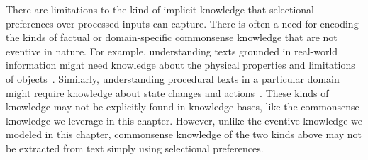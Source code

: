 There are limitations to the kind of implicit knowledge that selectional
preferences over processed inputs can capture.  There is often a need for
encoding the kinds of factual or domain-specific commonsense
knowledge that are not eventive in nature. For example, understanding texts
grounded in real-world information might need knowledge about the physical
properties and limitations of objects~\citep{forbes2017verb}. Similarly, understanding procedural texts
in a particular domain might require knowledge about state changes and
actions~\citep{Tandon2018ReasoningAA}. These kinds of knowledge may not be
explicitly found in knowledge bases, like the commonsense knowledge we leverage
in this chapter. However, unlike the eventive knowledge we modeled in this
chapter, commonsense knowledge of the two kinds above may not be extracted from text
simply using selectional preferences.
